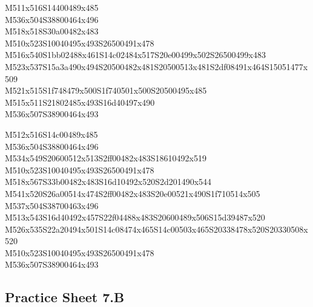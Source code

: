 \documentclass{article}
\begin{document}
\begin{multicols}{5}
\begin{center}
M511x516S14400489x485 %
\\M536x504S38800464x496 %
\\M518x518S30a00482x483 %
\\M510x523S10040495x493S26500491x478 %
\\M516x540S1bb02488x461S14c02484x517S20e00499x502S26500499x483 %
\\M523x537S15a3a490x494S20500482x481S20500513x481S2df08491x464S15051477x509 %
\\M521x515S1f748479x500S1f740501x500S20500495x485 %
\\M515x511S21802485x493S16d40497x490 %
\\M536x507S38900464x493 %
\vfil
\columnbreak

M512x516S14c00489x485 %
\\M536x504S38800464x496 %
\\M534x549S20600512x513S2ff00482x483S18610492x519 %
\\M510x523S10040495x493S26500491x478 %
\\M518x567S33b00482x483S16d10492x520S2d201490x544 %
\\M541x520S26a00514x474S2ff00482x483S20e00521x490S1f710514x505 %
\\M537x504S38700463x496 %
\\M513x543S16d40492x457S22f04488x483S20600489x506S15d39487x520 %
\\M526x535S22a20494x501S14c08474x465S14c00503x465S20338478x520S20330508x520 %
\\M510x523S10040495x493S26500491x478 %
\\M536x507S38900464x493 %
\vfil

\end{center}
\end{multicols}

\subsection{Practice Sheet 7.B}
\end{document}
